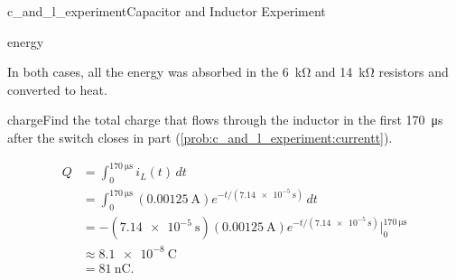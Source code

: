 \begin{mainquestion}{c_and_l_experiment}{Capacitor and Inductor Experiment}
\begin{partquestion}{energy}
\begin{answer}
In both cases, all the energy was absorbed in the \SI{6}{\kilo\ohm} and \SI{14}{\kilo\ohm} resistors and converted to heat.
\end{answer}
\end{partquestion}
\begin{partquestion}{charge}{Find the total charge that flows through the inductor in the first \SI{170}{\micro\second} after the switch closes in part (\cref{prob:c_and_l_experiment:currentt}).}
\begin{answer}
\begin{align*}
 Q
 &= \int_0^{\SI{170}{\micro\second}} i_L(t)\,dt \\
 &= \int_0^{\SI{170}{\micro\second}}
 (\SI{0.00125}{\ampere})e^{-t/(\SI{7.14e-5}{\second})}\,dt \\
 &= -\left(\SI{7.14e-5}{\second}\right)
    (\SI{0.00125}{\ampere})
    e^{-t/(\SI{7.14e-5}{\second})}
    \bigg|_0^{\SI{170}{\micro\second}} \\
 &\approx \SI{8.1e-8}{\coulomb} \\
 &= \boxed{\SI{81}{\nano\coulomb}}.
\end{align*}
\end{answer}
\end{partquestion}
\end{mainquestion}